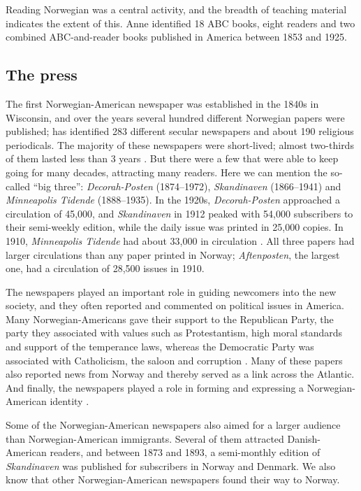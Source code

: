 \documentclass[output=paper]{langscibook}
\begin{document}
Reading Norwegian was a central activity, and the breadth of teaching material indicates the extent of this. Anne \citet[2]{Hvenekilde1992} identified 18 ABC books, eight readers and two combined ABC-and-reader books published in America between 1853 and 1925.

\subsection{The press}\label{sec:hjelde:6.2}

The first Norwegian\hyp American newspaper was established in the 1840s in Wisconsin, and over the years several hundred different Norwegian papers were published; \citet[372]{Lovoll2010} has identified 283 different secular newspapers and about 190 religious periodicals. The majority of these newspapers were short-lived; almost two-thirds of them lasted less than 3 years \citep[375]{Lovoll2010}. But there were a few that were able to keep going for many decades, attracting many readers. Here we can mention the so-called “big three”: \textit{Decorah-Posten} (1874--1972), \textit{Skandinaven} (1866--1941) and \textit{Minneapolis Tidende} (1888--1935). In the 1920s, \textit{Decorah-Posten} approached a circulation of 45,000, and \textit{Skandinaven} in 1912 peaked with 54,000 subscribers to their semi-weekly edition, while the daily issue was printed in 25,000 copies. In 1910, \textit{Minneapolis Tidende} had about 33,000 in circulation \citep[122--126]{Lovoll1984}. All three papers had larger circulations than any paper printed in Norway; \textit{Aftenposten}, the largest one, had a circulation of 28,500 issues in 1910. 

The newspapers played an important role in guiding newcomers into the new society, and they often reported and commented on political issues in America. Many Norwegian\hyp Americans gave their support to the Republican Party, the party they associated with values such as Protestantism, high moral standards and support of the temperance laws, whereas the Democratic Party was associated with Catholicism, the saloon and corruption \citep[121]{Lovoll1984}. Many of these papers also reported news from Norway and thereby served as a link across the Atlantic. And finally, the newspapers played a role in forming and expressing a Norwegian\hyp American identity \citep{Mathiesen2015}.

Some of the Norwegian\hyp American newspapers also aimed for a larger audience than Norwegian\hyp American immigrants. Several of them attracted Danish\hyp American readers, and between 1873 and 1893, a semi-monthly edition of \textit{Skandinaven} was published for subscribers in Norway and Denmark. We also know that other Norwegian\hyp American newspapers found their way to Norway.
\end{document}
